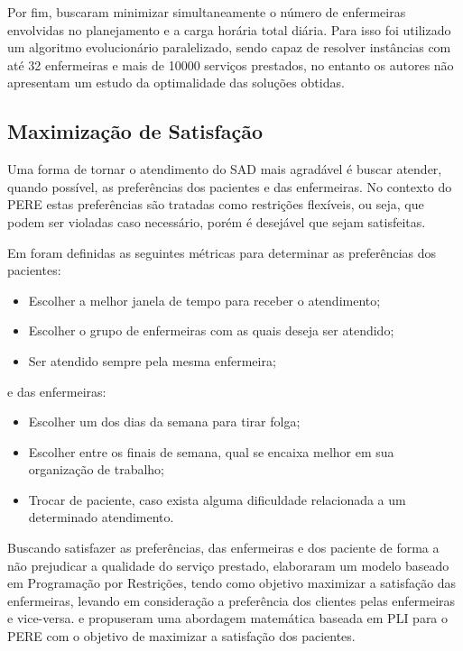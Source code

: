 Por fim,  buscaram minimizar simultaneamente o número de enfermeiras envolvidas no planejamento e a carga horária total diária. Para isso foi utilizado um algoritmo evolucionário paralelizado, sendo capaz de resolver instâncias com até 32 enfermeiras e mais de 10000 serviços prestados, no entanto os autores não apresentam um estudo da optimalidade das soluções obtidas.

\subsection{Maximização de Satisfação}

Uma forma de tornar o atendimento do \ac{SAD} mais agradável é buscar atender, quando possível, as preferências dos pacientes e das enfermeiras. No contexto do \ac{PERE} estas preferências são tratadas como restrições flexíveis, ou seja, que podem ser violadas caso necessário, porém é desejável que sejam satisfeitas.

Em  foram definidas as seguintes métricas para determinar as preferências dos pacientes: 

\begin{itemize}
\item Escolher a melhor janela de tempo para receber o atendimento;
\item Escolher o grupo de enfermeiras com as quais deseja ser atendido;
\item Ser atendido sempre pela mesma enfermeira;
\end{itemize}
e das enfermeiras: 
\begin{itemize}
\item Escolher um dos dias da semana para tirar folga;
\item Escolher entre os finais de semana, qual se encaixa melhor em sua organização de trabalho;
\item Trocar de paciente, caso exista alguma dificuldade relacionada a um determinado atendimento.
\end{itemize}


Buscando satisfazer as preferências, das enfermeiras e dos paciente de forma a não prejudicar a qualidade do serviço prestado,  elaboraram um modelo baseado em Programação por Restrições, tendo como objetivo maximizar a satisfação das enfermeiras, levando em consideração a preferência dos clientes pelas enfermeiras e vice-versa.  e  propuseram uma abordagem matemática baseada em \ac{PLI} para o \ac{PERE} com o objetivo de maximizar a satisfação dos pacientes.

